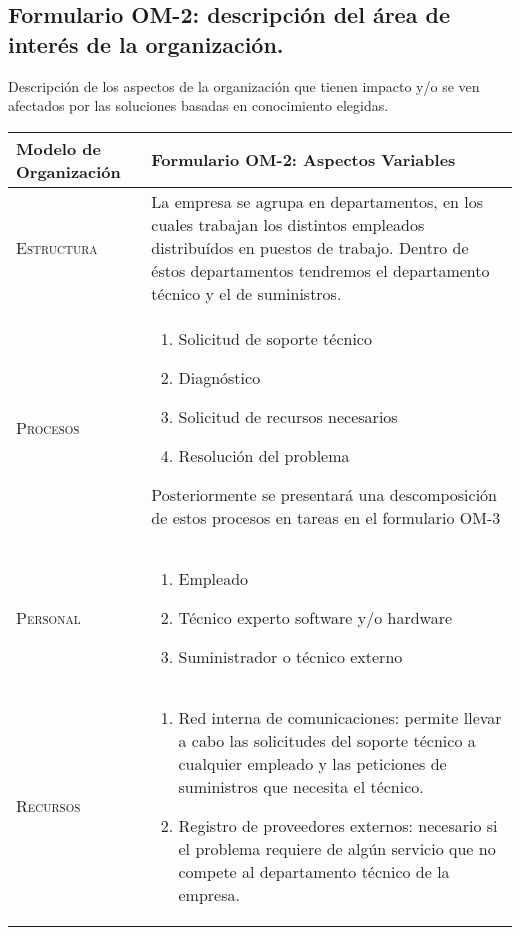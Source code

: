 \documentclass[12pt,a4paper,twoside,spanish]{article}      %
\begin{document}
\subsection{Formulario OM-2: descripción del área de interés de la organización.}

Descripción de los aspectos de la organización que tienen impacto y/o se ven afectados
  por las soluciones basadas en conocimiento elegidas.

\begin{table}[H]
\scriptsize
\begin{tabularx}{\textwidth}{|l|X|} \hline
\textbf{Modelo de Organización} & \textbf{Formulario OM-2: Aspectos Variables} \\ \hline\hline

\textsc{Estructura} & La empresa se agrupa en departamentos, en los cuales trabajan los distintos empleados distribuídos en puestos de trabajo. Dentro de éstos departamentos tendremos el departamento técnico y el de suministros.

 \\ \hline
\textsc{Procesos} &  
\begin{enumerate}
	\item Solicitud de soporte técnico
	\item Diagnóstico
	\item Solicitud de recursos necesarios
	\item Resolución del problema
\end{enumerate}
Posteriormente se presentará una descomposición de estos procesos en tareas en el formulario OM-3
\\ \hline
\textsc{Personal} & 
\begin{enumerate}
	\item Empleado
	\item Técnico experto software y/o hardware
	\item Suministrador o técnico externo
\end{enumerate}
\\ \hline
\textsc{Recursos} & 
\begin{enumerate}
	\item Red interna de comunicaciones: permite llevar a cabo las solicitudes del soporte técnico a cualquier empleado y las peticiones de suministros que necesita el técnico.
	\item Registro de proveedores externos: necesario si el problema requiere de algún servicio que no compete al departamento técnico de la empresa.
\end{enumerate}


\end{tabularx}
\end{table}
\end{document}

